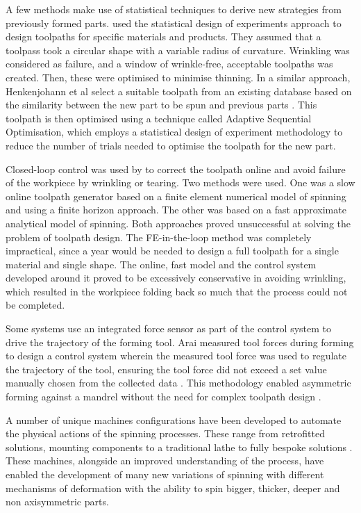 A few methods make use of statistical techniques to derive new strategies from previously formed parts. \cite{Auer2004ComparisonSpinning} used the statistical design of experiments approach to design toolpaths for specific materials and products. They assumed that a toolpass took a circular shape with a variable radius of curvature. Wrinkling was considered as failure, and a window of wrinkle-free, acceptable toolpaths was created. Then, these were optimised to minimise thinning. In a similar approach, Henkenjohann et al select a suitable toolpath from an existing database based on the similarity between the new part to be spun and previous parts \citep{Henkenjohann2005AnProcess}. This toolpath is then optimised using a technique called Adaptive Sequential Optimisation, which employs a statistical design of experiment methodology to reduce the number of trials needed to optimise the toolpath for the new part.


Closed-loop control was used by \cite{Polyblank2015TheSpinning} to correct the toolpath online and avoid failure of the workpiece by wrinkling or tearing. Two methods were used. One was a slow online toolpath generator based on a finite element numerical model of spinning and using a finite horizon approach. The other was based on a fast approximate analytical model of spinning. Both approaches proved unsuccessful at solving the problem of toolpath design.  The FE-in-the-loop method was completely impractical, since a year would be needed to design a full toolpath for a single material and single shape. The online, fast model and the control system developed around it proved to be excessively conservative in avoiding wrinkling, which resulted in the workpiece folding back so much that the process could not be completed.  

Some systems use an integrated force sensor as part of the control system to drive the trajectory of the forming tool. 
Arai measured tool forces during forming to design a control system wherein the measured tool force was used to regulate the trajectory of the tool, ensuring the tool force did not exceed a set value manually chosen from the collected data \citep{Arai2003RoboticControl}. 
This methodology enabled asymmetric forming against a mandrel without the need for complex toolpath design \citep{Arai2006Force-controlledMotors}.

A number of unique machines configurations have been developed to automate the physical actions of the spinning processes. These range from retrofitted solutions, mounting components to a traditional lathe \citep{Abd-Alrazzaq2019ARetrofit} to fully bespoke solutions \citep{Music2011FlexibleSpinning}. These machines, alongside an improved understanding of the process, have enabled the development of many new variations of spinning with different mechanisms of deformation \citep{Xia2014ASpinning} with the ability to spin bigger, thicker, deeper and non axisymmetric parts. 
 
